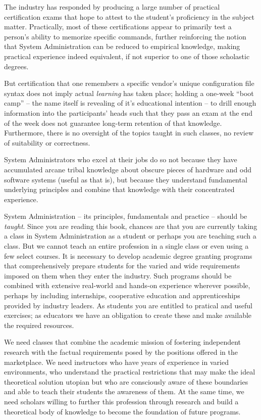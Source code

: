 The industry has responded by producing a large number
of practical certification exams that hope to attest
to the student's proficiency in the subject matter.
Practically, most of these certifications appear to
primarily test a person's ability to memorize specific
commands, further reinforcing the notion that System
Administration can be reduced to empirical knowledge,
making practical experience indeed equivalent, if not
superior to one of those scholastic degrees.

But certification that one remembers a specific
vendor's unique configuration file syntax does not
imply actual {\em learning} has taken place; holding a
one-week ``boot camp'' -- the name itself is revealing
of it's educational intention --  to drill enough
information into the participants' heads such that
they pass an exam at the end of the week does not
guarantee long-term retention of that knowledge.
Furthermore, there is no oversight of the topics
taught in such classes, no review of suitability or
correctness.

System Administrators who excel at their jobs do so
not because they have accumulated arcane tribal
knowledge about obscure pieces of hardware and odd
software systems (useful as that is), but because they
understand fundamental underlying principles and
combine that knowledge with their concentrated
experience.

System Administration -- its principles, fundamentals
and practice -- should be {\em taught}.  Since you are
reading this book, chances are that you are currently
taking a class in System Administration as a student
or perhaps you are teaching such a class.  But we
cannot teach an entire profession in a single class or
even using a few select courses.  It is necessary to
develop academic degree granting programs that
comprehensively prepare students for the varied and
wide requirements imposed on them when they enter the
industry.  Such programs should be combined with
extensive real-world and hands-on experience wherever
possible, perhaps by including internships,
cooperative education and apprenticeships provided by
industry leaders.  As students you are entitled to
pratical and useful exercises; as educators we have an
obligation to create these and make available the
required resources.

We need classes that combine the academic mission of
fostering independent research with the factual
requirements posed by the positions offered in the
marketplace.  We need instructors who have years of
experience in varied environments, who understand the
practical restrictions that may make the ideal
theoretical solution utopian but who are consciously
aware of these boundaries and able to teach their
students the awareness of them.  At the same time, we
need scholars willing to further this profession
through research and build a theoretical body of
knowledge to become the foundation of future programs.

